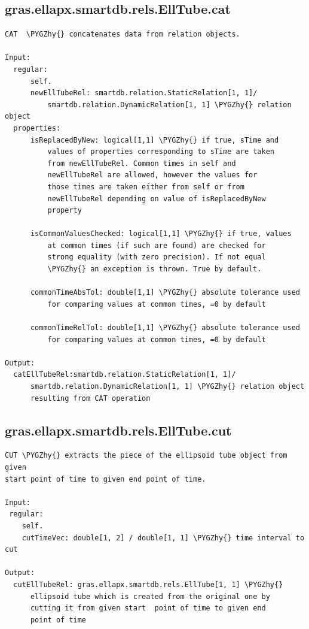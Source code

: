 \documentclass[letterpaper,10pt,english]{sphinxmanual}
\def\PYGZhy{\char`\-}
\begin{document}
\subsection{gras.ellapx.smartdb.rels.EllTube.cat}
\label{chap_functions:gras-ellapx-smartdb-rels-elltube-cat}
\begin{Verbatim}[commandchars=\\\{\}]
CAT  \PYGZhy{} concatenates data from relation objects.

Input:
  regular:
      self.
      newEllTubeRel: smartdb.relation.StaticRelation[1, 1]/
          smartdb.relation.DynamicRelation[1, 1] \PYGZhy{} relation object
  properties:
      isReplacedByNew: logical[1,1] \PYGZhy{} if true, sTime and
          values of properties corresponding to sTime are taken
          from newEllTubeRel. Common times in self and
          newEllTubeRel are allowed, however the values for
          those times are taken either from self or from
          newEllTubeRel depending on value of isReplacedByNew
          property

      isCommonValuesChecked: logical[1,1] \PYGZhy{} if true, values
          at common times (if such are found) are checked for
          strong equality (with zero precision). If not equal
          \PYGZhy{} an exception is thrown. True by default.

      commonTimeAbsTol: double[1,1] \PYGZhy{} absolute tolerance used
          for comparing values at common times, =0 by default

      commonTimeRelTol: double[1,1] \PYGZhy{} absolute tolerance used
          for comparing values at common times, =0 by default

Output:
  catEllTubeRel:smartdb.relation.StaticRelation[1, 1]/
      smartdb.relation.DynamicRelation[1, 1] \PYGZhy{} relation object
      resulting from CAT operation
\end{Verbatim}


\subsection{gras.ellapx.smartdb.rels.EllTube.cut}
\label{chap_functions:gras-ellapx-smartdb-rels-elltube-cut}
\begin{Verbatim}[commandchars=\\\{\}]
CUT \PYGZhy{} extracts the piece of the ellipsoid tube object from given
start point of time to given end point of time.

Input:
 regular:
    self.
    cutTimeVec: double[1, 2] / double[1, 1] \PYGZhy{} time interval to cut

Output:
  cutEllTubeRel: gras.ellapx.smartdb.rels.EllTube[1, 1] \PYGZhy{}
      ellipsoid tube which is created from the original one by
      cutting it from given start  point of time to given end
      point of time
\end{Verbatim}
\end{document}
